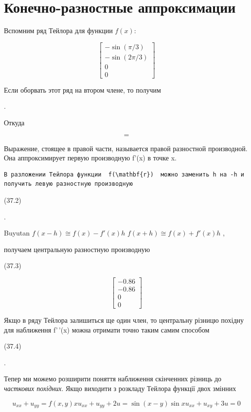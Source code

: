 \documentclass[
  ukrainian,
]{article}
\begin{document}
\section{Конечно-разностные
аппроксимации}\label{ux43aux43eux43dux435ux447ux43dux43e-ux440ux430ux437ux43dux43eux441ux442ux43dux44bux435-ux430ux43fux43fux440ux43eux43aux441ux438ux43cux430ux446ux438ux438}

Вспомним ряд Тейлора для функции \(f(x)\):

\[
\begin{bmatrix} -\sin{(\pi/3)} \\ -\sin{(2\pi/3)} \\ 0 \\ 0 \end{bmatrix}
\]

Если оборвать этот ряд на втором члене, то получим

.

Откуда

\[
=
\]

Выражение, стоящее в правой части, называется правой разностной
производной. Она аппроксимирует первую производную f'(x) в точке x.

\begin{verbatim}
В разложении Тейлора функции  f(\mathbf{r})  можно заменить h на -h и получить левую разностную производную
\end{verbatim}

(37.2)

.

Buyutan \(f(x - h) \cong f(x) - f'(x) h\)
\nif \(f(x + h) \cong f( x) + f'(x) h\) ,

получаем центральную разностную производную

(37.3)

\[
\begin{bmatrix} -0.86 \\ -0.86 \\ 0 \\ 0 \end{bmatrix}
\]

Якщо в ряду Тейлора залишиться ще один член, то центральну різницю
похідну для наближення f'\,'(x) можна отримати точно таким самим
способом

(37.4)

.

Тепер ми можемо розширити поняття наближення скінченних різниць до
\emph{часткових похідних}. Якщо виходити з розкладу Тейлора функції двох
змінних

\[
u_{xx} + u_{yy} = f(x, y)
xu_{xx} + u_{yy} + 2u = \sin(x - y)
\sin xu_{xx} + u_{xy} + 3u = 0
\]
\end{document}
